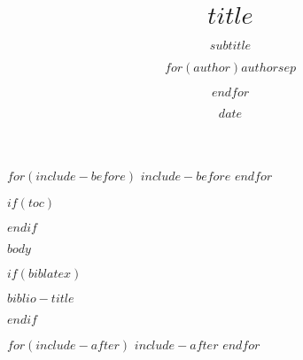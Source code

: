 \documentclass[darktitle]{beamer}
\title{$title$}
\subtitle{$subtitle$}
\author{$for(author)$$author$$sep$ \and $endfor$}
\date{$date$}
\begin{document}
\begin{frame}
    \titlepage
\end{frame}

$for(include-before)$
$include-before$
$endfor$

$if(toc)$
\begin{frame}
\tableofcontents[hideallsubsections]
\end{frame}
$endif$

$body$

$if(biblatex)$
\begin{frame}[allowframebreaks]{$biblio-title$}
\printbibliography[heading=none]
\end{frame}
$endif$

$for(include-after)$
$include-after$
$endfor$
\end{document}
